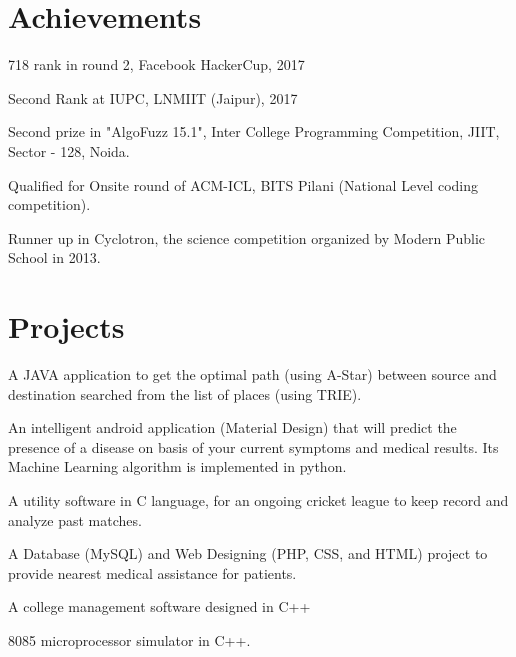\documentclass[]{hieudo-build}
\begin{document}
\begin{minipage}[t]{0.69\textwidth}
\section{Achievements}

\vspace{0.5em} 
\begin{tightemize}
\item 718 rank in round 2, Facebook HackerCup, 2017
\item Second Rank at IUPC, LNMIIT (Jaipur), 2017
\item Second prize in "AlgoFuzz 15.1", Inter College Programming Competition, JIIT, Sector - 128, Noida.
\item Qualified for Onsite round of ACM-ICL, BITS Pilani (National Level coding competition).
\item Runner up in Cyclotron, the science competition organized by Modern Public School in 2013.
\end{tightemize}
\sectionsep


\section{Projects}

\descript{}
A JAVA application to get the optimal path (using A-Star) between source and destination searched from the list of places (using TRIE).
\sectionsep

\descript{}
An intelligent android application (Material Design) that will predict the presence of a disease on basis of your current symptoms and medical results. Its Machine Learning algorithm is implemented in python.
\sectionsep

\descript{}
A utility software in C language, for an ongoing cricket league to keep record and analyze past matches.
\sectionsep 

\descript{}
A Database (MySQL) and Web Designing (PHP, CSS, and HTML) project to provide nearest medical assistance for patients.
\sectionsep

\descript{}
A college management software designed in C++%
\sectionsep 

\descript{}
8085 microprocessor simulator in C++.
\sectionsep 

\end{minipage} 
\end{document}
